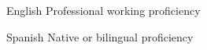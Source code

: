 
\begin{cventries}

  \cventry
    {English} %
    {Professional working proficiency}
    {}
    {}
    {}

  \cventry
    {Spanish} %
    {Native or bilingual proficiency}
    {}
    {}
    {}
    
\end{cventries}
